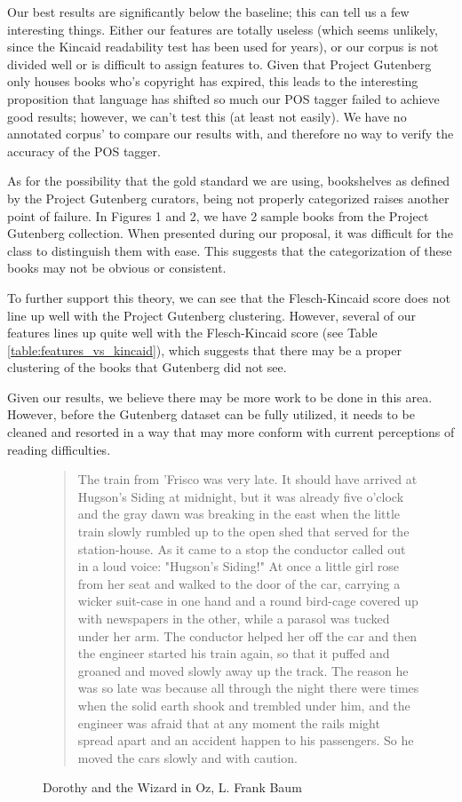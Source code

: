 \documentclass[]{article}
\begin{document}
Our best results are significantly below the baseline; this can tell us a few interesting things.
Either our features are totally useless (which seems unlikely, since the Kincaid readability test has been used for years), or our corpus is not divided well or is difficult to assign features to.
Given that Project Gutenberg only houses books who's copyright has expired, this leads to the interesting proposition that language has shifted so much our POS tagger failed to achieve good results; however, we can't test this (at least not easily).
We have no annotated corpus' to compare our results with, and therefore no way to verify the accuracy of the POS tagger.

As for the possibility that the gold standard we are using, bookshelves as defined by the Project Gutenberg curators, being not properly categorized raises another point of failure.
In Figures 1 and 2, we have 2 sample books from the Project Gutenberg collection.
When presented during our proposal, it was difficult for the class to distinguish them with ease.
This suggests that the categorization of these books may not be obvious or consistent.

To further support this theory, we can see that the Flesch-Kincaid score does not line up well with the Project Gutenberg clustering.
However, several of our features lines up quite well with the Flesch-Kincaid score (see Table \ref{table:features_vs_kincaid}), which suggests that there may be a proper clustering of the books that Gutenberg did not see.

Given our results, we believe there may be more work to be done in this area.
However, before the Gutenberg dataset can be fully utilized, it needs to be cleaned and resorted in a way that may more conform with current perceptions of reading difficulties.

\begin{figure}
	\begin{quotation}
		The train from 'Frisco was very late.  It should have arrived at Hugson's Siding at midnight, but it was already five o'clock and the gray dawn was breaking in the east when the little train slowly rumbled up to the open shed that served for the station-house.  As it came to a stop the conductor called out in a loud voice:
		"Hugson's Siding!"
		At once a little girl rose from her seat and walked to the door of the
		car, carrying a wicker suit-case in one hand and a round bird-cage
		covered up with newspapers in the other, while a parasol was tucked under her arm.  The conductor helped her off the car and then the engineer started his train again, so that it puffed and groaned and moved slowly away up the track.  The reason he was so late was because all through the night there were times when the solid earth shook and trembled under him, and the engineer was afraid that at any moment the rails might spread apart and an accident happen to his passengers.  So he moved the cars slowly and with caution.
	\end{quotation}
	\label{figure:book1}
	\caption{Dorothy and the Wizard in Oz, L. Frank Baum}
\end{figure}
\end{document}
